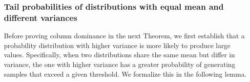 

\subsubsection{Tail probabilities of distributions with equal mean and different variances}
\label{supp-math-lemma-tail-probabilities}
%
Before proving column dominance in the next Theorem, we first establish that a probability distribution with higher variance is more likely to produce large values.  
%
Specifically, when two distributions share the same mean but differ in variance, the one with higher variance has a greater probability of generating samples that exceed a given threshold.  
%
We formalize this in the following lemma.
%


%

